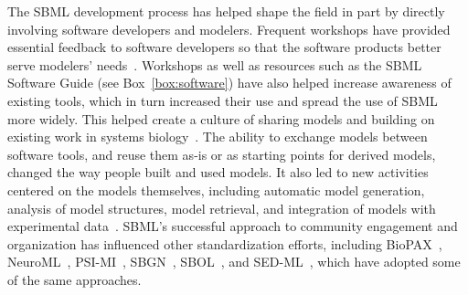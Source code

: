 \documentclass[]{draft-sbml-paper}
\begin{document}
The SBML development process has helped shape the field in part by directly involving software developers and modelers.  Frequent workshops have provided essential feedback to software developers so that the software products better serve modelers' needs~\citep[e.g.,][]{waltemath2014meeting}.  Workshops as well as resources such as the SBML Software Guide (see Box~\ref{box:software}) have also helped increase awareness of existing tools, which in turn increased their use and spread the use of SBML more widely.  This helped create a culture of sharing models and building on existing work in systems biology~\citep{stanford2015evolution}.  The ability to exchange models between software tools, and reuse them as-is or as starting points for derived models, changed the way people built and used models.  It also led to new activities centered on the models themselves, including automatic model generation, analysis of model structures, model retrieval, and integration of models with experimental data~\citep{Draeger2014}.  SBML's successful approach to community engagement and organization has influenced other standardization efforts, including BioPAX~\citep{Demir2010}, NeuroML~\citep{Gleeson2010}, PSI-MI~\citep{hermjakob2004the}, SBGN~\citep{VanIersel2012}, SBOL~\citep{Roehner2016}, and SED-ML~\citep{waltemath2011reproducible, Kohn2008sedml}, which have adopted some of the same approaches.
\end{document}
